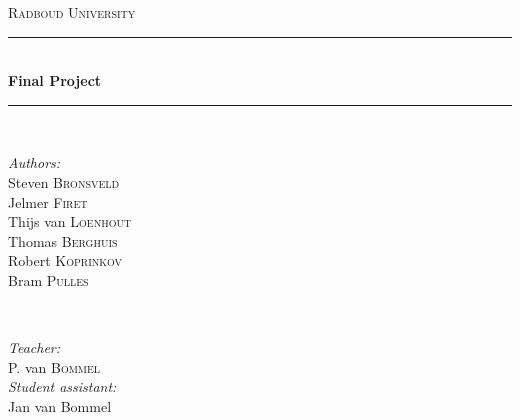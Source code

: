 \documentclass[main.tex]{subfiles}
\begin{document}
\begin{titlepage}
    \newcommand{\HRule}{\rule{\linewidth}{0.5mm}} 

    \center 
    \textsc{\LARGE Radboud University}\\[0.5cm] 

    \HRule \\[0.4cm]
        {\huge \bfseries Final Project}\\[0.3cm] 
    \HRule \\[1.5cm]

    \begin{figure}[ht]
     	\centering
    \end{figure}

    \begin{minipage}{0.4\textwidth}
        \begin{flushleft} \large
            \emph{Authors:}\\
            Steven \textsc{Bronsveld} \\
            Jelmer \textsc{Firet} \\
            Thijs van \textsc{Loenhout} \\
            Thomas \textsc{Berghuis} \\
            Robert \textsc{Koprinkov} \\
            Bram \textsc{Pulles} \\
        \end{flushleft}
    \end{minipage}
    ~
    \begin{minipage}{0.4\textwidth}
        \begin{flushright} \large
            \emph{Teacher:} \\
            P. van \textsc{Bommel} \\
            \emph{Student assistant:} \\
            Jan van Bommel 
        \end{flushright}
    \end{minipage}\\[2cm]

    \vfill 

\end{titlepage}
\end{document}
